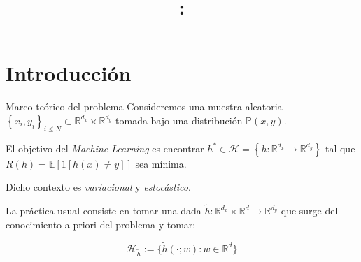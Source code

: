 \documentclass{beamer}
\title[]
{\textbf{\textcolor[rgb]{0.0,0.50,0}{\Large \myTitle: \mySubtitle}}}
\title[\myTitle: \mySubtitle]{\bf {\myTitle}}
\author[\myName]{\myName}
\institute{\myFaculty}
\date[\myTime]{\myDepartment}
\newcommand{\R}{{\mathbb{R}}}
\newcommand{\sett}[1]{\left\lbrace#1\right\rbrace}
\begin{document}
\begin{frame}

\titlepage
\vspace{-1.6cm}
\begin{center}
	
\end{center}
\end{frame}

\section{Introducci\'on}

\begin{frame}{Marco te\'orico del problema}
Consideremos una muestra aleatoria $\sett{x_i, y_i}_{i \leq N} \subset \R^{d_x} \times \R^{d_y}$ tomada bajo una distribuci\'on $\mathbb{P}(x,y)$.

\bigskip

El objetivo del \textit{Machine Learning} es encontrar $h^* \in \mathcal{H} = \sett{h : \R^{d_x} \rightarrow \R^{d_y}}$ tal que $R(h) = \mathbb{E} \left[1 \left[h(x) \neq y \right] \right]$ sea m\'inima.

\bigskip
\pause

Dicho contexto es \textit{variacional} y \textit{estoc\'astico}. 

\pause
\bigskip

La pr\'actica usual consiste en tomar una dada $\widetilde{h}: \R^{d_x} \times \R^d \rightarrow \R^{d_y}$ que surge del conocimiento a priori del problema y tomar:


\begin{equation*}
\mathcal{H}_{\widetilde{h}} := \lbrace \widetilde{h}(\cdot ; w): w \in \mathbb{R}^d \rbrace
\end{equation*}



\end{frame}
\end{document}
